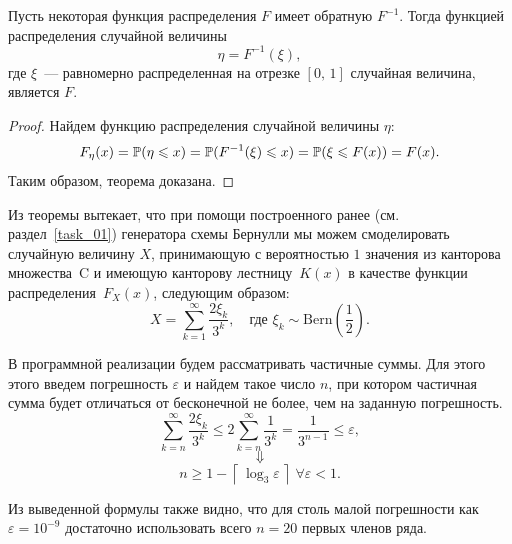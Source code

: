 \begin{theorem}
\label{th:inv-method}
        Пусть некоторая функция распределения $F$ имеет обратную $F^{-1}$. Тогда функцией распределения случайной величины
        $$
                \eta = F^{-1}(\xi),
        $$
        где $\xi$~--- равномерно распределенная на отрезке $[0,\,1]$ случайная величина, является $F$.
\end{theorem}
\begin{proof}
        Найдем функцию распределения случайной величины $\eta$:
        $$
                F_\eta(x) =
                \mathbb{P}(\eta \leqslant x) =
                \mathbb{P}(F^{-1}(\xi) \leqslant x) =
                \mathbb{P}(\xi \leqslant F(x)) =
                F(x).
        $$
        Таким образом, теорема доказана.
\end{proof}

Из теоремы вытекает, что при помощи построенного ранее (см. раздел~\ref{task_01}) генератора схемы Бернулли мы можем смоделировать случайную величину $X$, принимающую с вероятностью $1$ значения из канторова множества~C и имеющую канторову лестницу~$K(x)$ в качестве функции распределения~$F_X(x)$, следующим образом:
$$
        X = \sum_{k = 1}^{\infty}\frac{2\xi_k}{3^k},
        \quad
        \mbox{где $\xi_k\sim\mbox{Bern}\left(\frac12\right)$.}
$$

В программной реализации будем рассматривать частичные суммы. Для этого этого введем погрешность $\varepsilon$ и найдем такое число $n$, при котором частичная сумма будет отличаться от бесконечной не более, чем на заданную погрешность.
$$
        \sum_{k=n}^{\infty} \frac{2\xi_k}{3^k} \leqslant 2\sum_{k=n}^{\infty}\frac{1}{3^k} = \frac{1}{3^{n-1}} \leqslant \varepsilon,
$$
$$
        \Downarrow
$$
$$
        n \geqslant 1 - \left\lceil\,\log_3 \varepsilon\,\right\rceil \; \forall \varepsilon < 1.
$$
\begin{remark}
        Из выведенной формулы также видно, что для столь малой погрешности как $\varepsilon = 10^{-9}$ достаточно использовать всего $n = 20$ первых членов ряда.
\end{remark}


